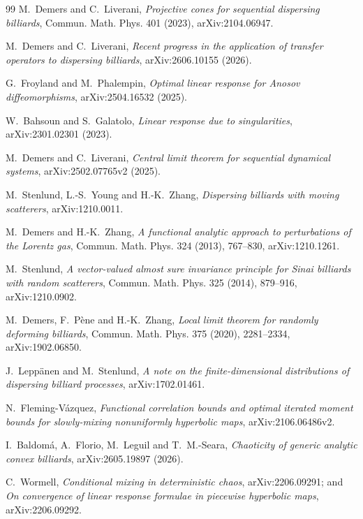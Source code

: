 \documentclass[11pt]{article}
\begin{document}
\begingroup\raggedright
\begin{thebibliography}{99}
M.~Demers and C.~Liverani,
\emph{Projective cones for sequential dispersing billiards},
Commun. Math. Phys. 401 (2023), arXiv:2104.06947.

M.~Demers and C.~Liverani,
\emph{Recent progress in the application of transfer operators to dispersing
billiards}, arXiv:2606.10155 (2026).

G.~Froyland and M.~Phalempin,
\emph{Optimal linear response for Anosov diffeomorphisms},
arXiv:2504.16532 (2025).

W.~Bahsoun and S.~Galatolo,
\emph{Linear response due to singularities}, arXiv:2301.02301 (2023).

M.~Demers and C.~Liverani,
\emph{Central limit theorem for sequential dynamical systems},
arXiv:2502.07765v2 (2025).

M.~Stenlund, L.-S.~Young and H.-K.~Zhang,
\emph{Dispersing billiards with moving scatterers},
arXiv:1210.0011.

M.~Demers and H.-K.~Zhang,
\emph{A functional analytic approach to perturbations of the Lorentz gas},
Commun. Math. Phys. 324 (2013), 767--830, arXiv:1210.1261.

M.~Stenlund,
\emph{A vector-valued almost sure invariance principle for Sinai billiards
with random scatterers},
Commun. Math. Phys. 325 (2014), 879--916, arXiv:1210.0902.

M.~Demers, F.~P\`ene and H.-K.~Zhang,
\emph{Local limit theorem for randomly deforming billiards},
Commun. Math. Phys. 375 (2020), 2281--2334, arXiv:1902.06850.

J.~Lepp\"anen and M.~Stenlund,
\emph{A note on the finite-dimensional distributions of dispersing billiard processes},
arXiv:1702.01461.

N.~Fleming-V\'azquez,
\emph{Functional correlation bounds and optimal iterated moment bounds for
slowly-mixing nonuniformly hyperbolic maps}, arXiv:2106.06486v2.

I.~Baldom\'a, A.~Florio, M.~Leguil and T.~M.-Seara,
\emph{Chaoticity of generic analytic convex billiards},
arXiv:2605.19897 (2026).

C.~Wormell,
\emph{Conditional mixing in deterministic chaos},
arXiv:2206.09291; and
\emph{On convergence of linear response formulae in piecewise hyperbolic maps},
arXiv:2206.09292.


\end{thebibliography}
\end{document}
